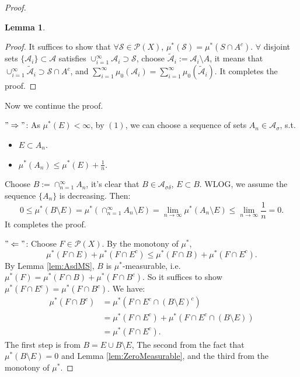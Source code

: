 \documentclass{article}
\newtheorem{lemma}{Lemma}
\newcommand{\cp}[1]{\cup_{#1=1}^{\infty}}
\newcommand{\sm}[1]{\sum_{#1=1}^{\infty}}
\begin{document}
\begin{proof}
\begin{lemma}
    \end{lemma}
    \begin{proof}
        It suffices to show that $\forall\mathcal{S}\in\mathcal{P}(X)$, 
        $\mu^{*}(\mathcal{S})=\mu^{*}(S\cap A^{c})$. 
        $\forall$ disjoint sets $\{\mathcal{A}_{i}\}\subset\mathcal{A}$ 
        satisfies $\cup_{i=1}^{\infty}
        \mathcal{A}_{i}\supset\mathcal{S}$, 
        choose $\tilde{\mathcal{A}}_{i}:=\mathcal{A}_{i}\setminus A$, 
        it means that 
        $\cp{i}\tilde{\mathcal{A}}_{i}\supset\mathcal{S}\cap A^c$, 
        and $\sm{i}\mu_{0}(\mathcal{A}_{i})
        =\sm{i}\mu_{0}(\tilde{\mathcal{A}}_{i})$. 
        It completes the proof.
    \end{proof}
    Now we continue the proof.

    $"\Rightarrow"$: 
    As $\mu^{*}(E)<\infty$, 
    by $(1)$, we can choose a sequence of sets 
    $A_{n}\in\mathcal{A}_{\sigma}$, s.t. 
    \begin{itemize}
        \item $E\subset A_{n}$.
        \item $\mu^*(A_{n})\le\mu^{*}(E)+\frac{1}{n}$.
    \end{itemize}
    Choose $B:=\cap_{n=1}^{\infty}A_{n}$, 
    it's clear that $B\in\mathcal{A}_{\sigma\delta}$, $E\subset B$. 
    WLOG, we assume the sequence $\{A_{n}\}$ is decreasing. 
    Then:
    \begin{displaymath}
        0\le\mu^{*}(B\setminus E)=\mu^{*}
        (\cap_{n=1}^{\infty}A_{n}\setminus E)
        =\lim_{n\rightarrow\infty}\mu^{*}(A_{n}\setminus E)
        \le\lim_{n\rightarrow\infty}\frac{1}{n}
        =0.
    \end{displaymath}
    It completes the proof.

    $"\Leftarrow"$: Choose $F\in\mathcal{P}(X)$. 
    By the monotony of $\mu^{*}$, 
    \begin{displaymath}
        \mu^{*}(F\cap E)+\mu^{*}(F\cap E^{c})\le \mu^{*}(F\cap B)
        +\mu^{*}(F\cap E^c).
    \end{displaymath}
    By Lemma \ref{lem:AsdMS}, $B$ is $\mu^*$-measurable, i.e. 
    $\mu^{*}(F)=\mu^{*}(F\cap B)+\mu^{*}(F\cap B^{c})$. 
    So it suffices to show 
    $\mu^{*}(F\cap E^{c})=\mu^{*}(F\cap B^{c})$. 
    We have:
    \begin{displaymath}
        \begin{aligned}
        \mu^{*}(F\cap B^c)&=\mu^{*}(F\cap E^{c}\cap(B\setminus E)^{c})\\
        &=\mu^{*}(F\cap E^{c})+\mu^{*}(F\cap E^{c}\cap(B\setminus E))\\
        &=\mu^{*}(F\cap E^{c}).
        \end{aligned}
    \end{displaymath}
    The first step is from $B=E\cup B\setminus E$, 
    The second from the fact that $\mu^{*}(B\setminus E)=0$ 
    and Lemma \ref{lem:ZeroMeasurable}, 
    and the third from the monotony of $\mu^{*}$.


\end{proof}
\end{document}

